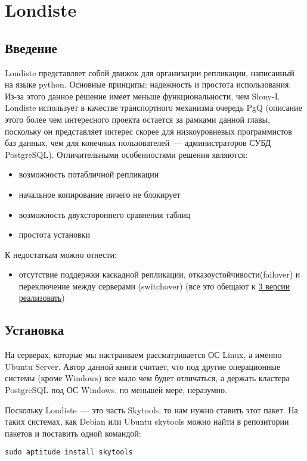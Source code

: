 \section{Londiste}
\label{sec:londiste}
\subsection{Введение}
Londiste представляет собой движок для организации репликации, написанный на языке python.
Основные принципы: надежность и простота использования. Из-за этого данное решение имеет меньше функциональности,
чем Slony-I. Londiste использует в качестве транспортного механизма очередь PgQ  (описание этого более чем интересного
проекта остается за рамками данной главы, поскольку он представляет интерес скорее для низкоуровневых программистов
баз данных, чем для конечных пользователей~--- администраторов СУБД PostgreSQL). Отличительными особенностями решения являются:
\begin{itemize}
\item возможность потабличной репликации
\item начальное копирование ничего не блокирует
\item возможность двухстороннего сравнения таблиц
\item простота установки
\end{itemize}

К недостаткам можно отнести:
\begin{itemize}
\item отсутствие поддержки каскадной репликации, отказоустойчивости(failover) и переключение между
серверами (switchover) (все это обещают к \href{http://skytools.projects.postgresql.org/skytools-3.0/doc/skytools3.html}{3 версии реализовать})
\end{itemize}


\subsection{Установка}
На серверах, которые мы настраиваем рассматривается ОС Linux, а именно Ubuntu Server.
Автор данной книги считает, что под другие операционные системы (кроме Windows) все мало чем будет отличаться,
а держать кластера PostgreSQL под ОС Windows, по меньшей мере, неразумно.

Поскольку Londiste~--- это часть Skytools, то нам нужно ставить этот пакет. На таких системах, как Debian или Ubuntu skytools
можно найти в репозитории пакетов и поставить одной командой:
\begin{lstlisting}[label=lst:londiste1,caption=Установка]
sudo aptitude install skytools
\end{lstlisting}

